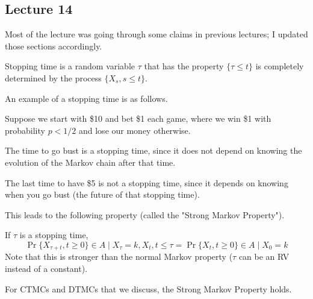 \subsection{Lecture 14}

Most of the lecture was going through some claims in previous lectures; I updated those sections accordingly.

\begin{definition}
    Stopping time is a random variable $\tau$ that has the property
    $\{ \tau \leq t \}$ is completely determined by the process $\{ X_s, s \leq t \}$.
\end{definition}

An example of a stopping time is as follows.

\begin{example}[Gambling]
    Suppose we start with \$10 and bet \$1 each game, where we win \$1 with probability $p < 1/2$ and lose our money otherwise.

    The time to go bust is a stopping time, since it does not depend on knowing the evolution of the Markov chain after that time.

    The last time to have \$5 is not a stopping time, since it depends on knowing when you go bust (the future of that stopping time).
\end{example}

This leads to the following property (called the "Strong Markov Property").

\begin{theorem}
    If $\tau$ is a stopping time,
    \[ \Pr{\{X_{\tau + t}, t \geq 0\} \in A \mid X_{\tau} = k, X_t, t \leq \tau} = \Pr{\{X_t, t \geq 0\} \in A \mid X_0 = k}\]
    Note that this is stronger than the normal Markov property ($\tau$ can be an RV instead of a constant).
\end{theorem}

For CTMCs and DTMCs that we discuss, the Strong Markov Property holds.